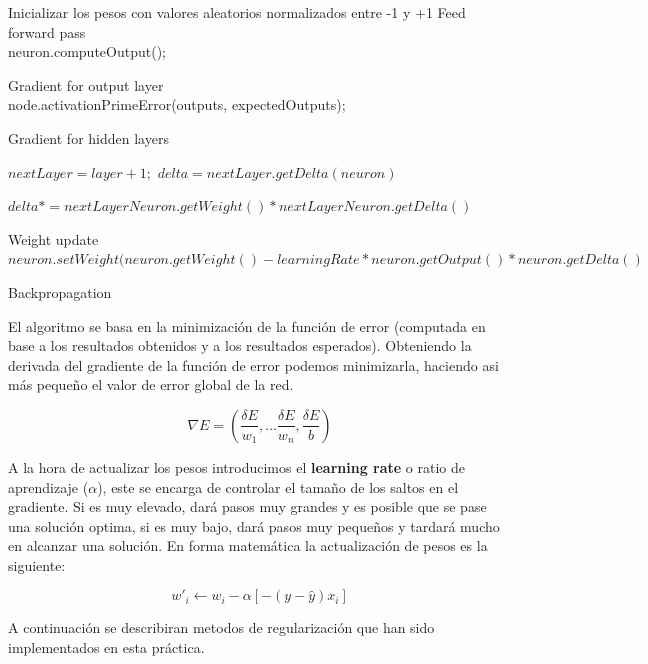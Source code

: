 \begin{algorithm}[H]
    Inicializar los pesos con valores aleatorios normalizados entre -1 y +1
    Feed forward pass\\
    {
        {
            neuron.computeOutput();
        }
	}
	
	Gradient for output layer\\
	{
	    node.activationPrimeError(outputs, expectedOutputs);
	}
	
	Gradient for hidden layers
	{
	    {   
	        $nextLayer = layer + 1;$
	        $delta = nextLayer.getDelta(neuron)$
	        
	        {
	            $delta *= nextLayerNeuron.getWeight() * nextLayerNeuron.getDelta()$
	        }
	    }
	}
	
	Weight update\\
    {
        {
            $neuron.setWeight(neuron.getWeight() - learningRate * neuron.getOutput() * neuron.getDelta()$
        }
    }
	    
	\caption{Backpropagation}
	\label{alg:backprop}
\end{algorithm}

El algoritmo se basa en la minimización de la función de error (computada en base a los resultados obtenidos y a los resultados esperados). Obteniendo la derivada del gradiente de la función de error podemos minimizarla, haciendo asi más pequeño el valor de error global de la red.

\[
    \nabla E = \left( \dfrac{\delta E}{w_1}, \dots  \dfrac{\delta E}{w_n}, \dfrac{\delta E}{b} \right)
\]

A la hora de actualizar los pesos introducimos el \textbf{learning rate} o ratio de aprendizaje ($\alpha$), este se encarga de controlar el tamaño de los saltos en el gradiente. Si es muy elevado, dará pasos muy grandes y es posible que se pase una solución optima, si es muy bajo, dará pasos muy pequeños y tardará mucho en alcanzar una solución. En forma matemática la actualización de pesos es la siguiente:

\[
    w\prime_i \longleftarrow w_i - \alpha[-(y - \hat{y}) x_i]
\]

A continuación se describiran metodos de regularización que han sido implementados en esta práctica.

